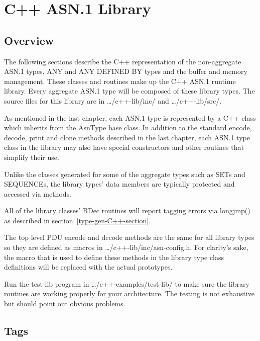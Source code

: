 
%

\chapter{\label{lib-C++-chapter}C++ ASN.1 Library}
\section{\label{libover-C++-section}Overview}

The following sections describe the C++ representation of the
non-aggregate ASN.1 types, ANY and ANY DEFINED BY types and
the buffer and memory management.  These classes and routines make
up the C++ ASN.1 runtime library. Every aggregate ASN.1 type will be
composed of these library types. The source files for this library
are in {\ufn \dots/c++-lib/inc/} and {\ufn \dots/c++-lib/src/}.

As mentioned in the last chapter, each ASN.1 type is represented by a
C++ class which inherits from the {\C AsnType} base class.  In
addition to the standard encode, decode, print and clone methods
described in the last chapter, each ASN.1 type class in the library
may also have special constructors and other routines that simplify
their use.

Unlike the classes generated for some of the aggregate types such as
SETs and SEQUENCEs, the library types' data members are typically
protected and accessed via methods.

All of the library classes' {\C BDec} routines will report tagging errors
via {\C longjmp()} as described in section~\ref{type-gen-C++-section}.

The top level PDU encode and decode methods are the same for all
library types so they are defined as macros in
{\ufn \dots/c++-lib/inc/asn-config.h}. For clarity's sake, the macro
that is used to define these methods in the library type class
definitions will be replaced with the actual prototypes.

Run the {\ufn test-lib} program in {\ufn \dots/c++-examples/test-lib/}
to make sure the library routines are working properly for your
architecture.  The testing is not exhaustive but should point out
obvious problems.


\section{\label{tag-C++-section}Tags}

